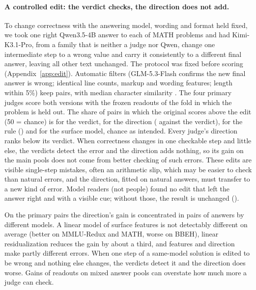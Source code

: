 \documentclass[11pt]{article}
\newcounter{takeaway}
\begin{document}
\paragraph{A controlled edit: the verdict checks, the direction does not add.} To change correctness with the answering model, wording and format held fixed, we took one right Qwen3.5-4B answer to each of  MATH problems and had Kimi-K3.1-Pro, from a family that is neither a judge nor Qwen, change one intermediate step to a wrong value and carry it consistently to a different final answer, leaving all other text unchanged. The protocol was fixed before scoring (Appendix~\ref{app:edit}). Automatic filters (GLM-5.3-Flash confirms the new final answer is wrong; identical line counts, markup and wording features; length within 5\%) keep  pairs, with median character similarity . The four primary judges score both versions with the frozen readouts of the fold in which the problem is held out. The share of pairs in which the original scores above the edit (50 = chance) is  for the verdict,  for the direction ( against the verdict),  for the rule () and  for the surface model, chance as intended. Every judge's direction ranks below its verdict. When correctness changes in one checkable step and little else, the verdicts detect the error and the direction adds nothing, so its gain on the main pools does not come from better checking of such errors. These edits are visible single-step mistakes, often an arithmetic slip, which may be easier to check than natural errors, and the direction, fitted on natural answers, must transfer to a new kind of error. Model readers (not people) found no edit that left the answer right and  with a visible cue; without those, the result is unchanged ().

\begin{takeaway}
On the primary pairs the direction's gain is concentrated in pairs of answers by different models. A linear model of surface features is not detectably different on average (better on MMLU-Redux and MATH, worse on BBEH), linear residualization reduces the gain by about a third, and features and direction make partly different errors. When one step of a same-model solution is edited to be wrong and nothing else changes, the verdicts detect it and the direction does worse. Gains of readouts on mixed answer pools can overstate how much more a judge can check.
\end{takeaway}
\end{document}

